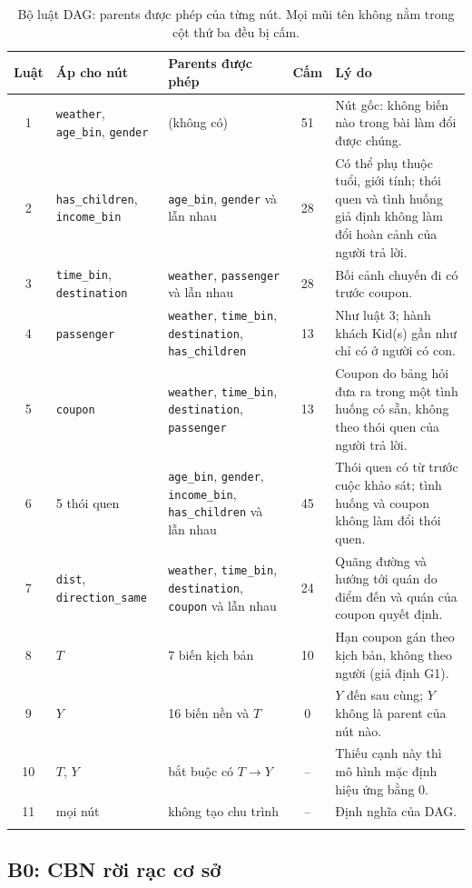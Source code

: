 \documentclass[pdflatex,sn-mathphys-num]{sn-jnl}%
\newcommand{\var}[1]{\texttt{#1}}                 %
\begin{document}
\begin{table}[t]
\caption{Bộ luật DAG: parents được phép của từng nút. Mọi mũi tên không nằm trong cột thứ ba đều bị cấm.}\label{tab:rules}
\setlength{\tabcolsep}{4pt}
\begin{tabular}{@{}cL{2.5cm}L{3.3cm}cL{4.4cm}@{}}
\toprule
Luật & Áp cho nút & Parents được phép & Cấm & Lý do \\
 & \var{weather}, \var{age\_bin}, \var{gender} & (không có) & 51 & Nút gốc: không biến nào trong bài làm đổi được chúng. \\
2 & \var{has\_children}, \var{income\_bin} & \var{age\_bin}, \var{gender} và lẫn nhau & 28 & Có thể phụ thuộc tuổi, giới tính; thói quen và tình huống giả định không làm đổi hoàn cảnh của người trả lời. \\
3 & \var{time\_bin}, \var{destination} & \var{weather}, \var{passenger} và lẫn nhau & 28 & Bối cảnh chuyến đi có trước coupon. \\
4 & \var{passenger} & \var{weather}, \var{time\_bin}, \var{destination}, \var{has\_children} & 13 & Như luật 3; hành khách Kid(s) gần như chỉ có ở người có con. \\
5 & \var{coupon} & \var{weather}, \var{time\_bin}, \var{destination}, \var{passenger} & 13 & Coupon do bảng hỏi đưa ra trong một tình huống có sẵn, không theo thói quen của người trả lời. \\
6 & 5 thói quen & \var{age\_bin}, \var{gender}, \var{income\_bin}, \var{has\_children} và lẫn nhau & 45 & Thói quen có từ trước cuộc khảo sát; tình huống và coupon không làm đổi thói quen. \\
7 & \var{dist}, \var{direction\_same} & \var{weather}, \var{time\_bin}, \var{destination}, \var{coupon} và lẫn nhau & 24 & Quãng đường và hướng tới quán do điểm đến và quán của coupon quyết định. \\
8 & $T$ & 7 biến kịch bản & 10 & Hạn coupon gán theo kịch bản, không theo người (giả định G1). \\
9 & $Y$ & 16 biến nền và $T$ & 0 & $Y$ đến sau cùng; $Y$ không là parent của nút nào. \\
10 & $T$, $Y$ & bắt buộc có $T \to Y$ & -- & Thiếu cạnh này thì mô hình mặc định hiệu ứng bằng 0. \\
11 & mọi nút & không tạo chu trình & -- & Định nghĩa của DAG. \\
\botrule
\end{tabular}
\end{table}

\subsection{B0: CBN rời rạc cơ sở}\label{sec:b0}
\end{document}
